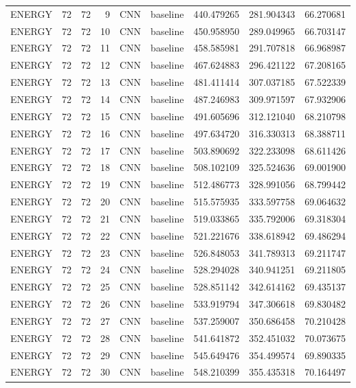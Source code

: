 \begin{table}
\begin{tabular}{lrrrllrrr}
ENERGY & 72 & 72 & 9 & CNN & baseline & 440.479265 & 281.904343 & 66.270681 \\
ENERGY & 72 & 72 & 10 & CNN & baseline & 450.958950 & 289.049965 & 66.703147 \\
ENERGY & 72 & 72 & 11 & CNN & baseline & 458.585981 & 291.707818 & 66.968987 \\
ENERGY & 72 & 72 & 12 & CNN & baseline & 467.624883 & 296.421122 & 67.208165 \\
ENERGY & 72 & 72 & 13 & CNN & baseline & 481.411414 & 307.037185 & 67.522339 \\
ENERGY & 72 & 72 & 14 & CNN & baseline & 487.246983 & 309.971597 & 67.932906 \\
ENERGY & 72 & 72 & 15 & CNN & baseline & 491.605696 & 312.121040 & 68.210798 \\
ENERGY & 72 & 72 & 16 & CNN & baseline & 497.634720 & 316.330313 & 68.388711 \\
ENERGY & 72 & 72 & 17 & CNN & baseline & 503.890692 & 322.233098 & 68.611426 \\
ENERGY & 72 & 72 & 18 & CNN & baseline & 508.102109 & 325.524636 & 69.001900 \\
ENERGY & 72 & 72 & 19 & CNN & baseline & 512.486773 & 328.991056 & 68.799442 \\
ENERGY & 72 & 72 & 20 & CNN & baseline & 515.575935 & 333.597758 & 69.064632 \\
ENERGY & 72 & 72 & 21 & CNN & baseline & 519.033865 & 335.792006 & 69.318304 \\
ENERGY & 72 & 72 & 22 & CNN & baseline & 521.221676 & 338.618942 & 69.486294 \\
ENERGY & 72 & 72 & 23 & CNN & baseline & 526.848053 & 341.789313 & 69.211747 \\
ENERGY & 72 & 72 & 24 & CNN & baseline & 528.294028 & 340.941251 & 69.211805 \\
ENERGY & 72 & 72 & 25 & CNN & baseline & 528.851142 & 342.614162 & 69.435137 \\
ENERGY & 72 & 72 & 26 & CNN & baseline & 533.919794 & 347.306618 & 69.830482 \\
ENERGY & 72 & 72 & 27 & CNN & baseline & 537.259007 & 350.686458 & 70.210428 \\
ENERGY & 72 & 72 & 28 & CNN & baseline & 541.641872 & 352.451032 & 70.073675 \\
ENERGY & 72 & 72 & 29 & CNN & baseline & 545.649476 & 354.499574 & 69.890335 \\
ENERGY & 72 & 72 & 30 & CNN & baseline & 548.210399 & 355.435318 & 70.164497 \\

\end{tabular}
\end{table}
